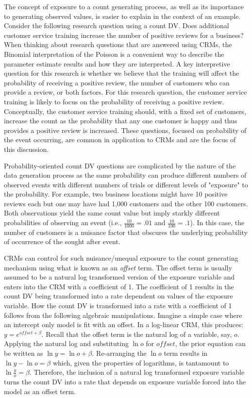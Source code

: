 \documentclass[ShortAfour,times,sageapa]{sagej}
\begin{document}
	The concept of exposure to a count generating process, as well as its importance to generating observed values, is easier to explain in the context of an example.
	Consider the following research question using a count DV.
	Does additional customer service training increase the number of positive reviews for a business?
	When thinking about research questions that are answered using CRMs, the Binomial interpretation of the Poisson is a convenient way to describe the parameter estimate results and how they are interpreted.
	A key interpretive question for this research is whether we believe that the training will affect the probability of receiving a positive review, the number of customers who can provide a review, or both factors.
	For this research question, the customer service training is likely to focus on the probability of receiving a positive review.
	Conceptually, the customer service training should, with a fixed set of customers, increase the count as the probability that any one customer is happy and thus provides a positive review is increased.
	These questions, focused on probability of the event occurring, are common in application to CRMs and are the focus of this discussion.
	
	Probability-oriented count DV questions are complicated by the nature of the data generation process as the same probability can produce different numbers of observed events with different numbers of trials or different levels of "exposure" to the probability.
	For example, two business locations might have 10 positive reviews each but one may have had 1,000 customers and the other 100 customers.
	Both observations yield the same count value but imply starkly different probabilities of observing an event (i.e., $\frac{10}{1000} = .01$ and $\frac{10}{100} = .1$).
	In this case, the number of customers is a nuisance factor that obscures the underlying probability of occurrence of the sought after event.
	
	CRMs can control for such nuisance/unequal exposure to the count generating mechanism using what is known as an \emph{offset} term.  
	The offset term is usually assumed to be a natural log transformed version of the exposure variable and enters into the CRM with a coefficient of 1.
	The coefficient of 1 results in the count DV being transformed into a rate dependent on values of the exposure variable.
	How the count DV is transformed into a rate with a coefficient of 1 follows from the following algebraic manipulations.
	Imagine a simple case where an intercept only model is fit with an offset.
	In a log-linear CRM, this produces: $y = e^{offset + \beta}$.
	Recall that the offset term is the natural log of a variable, say, $o$.  
	Applying the natural log and substituting $\ln o$ for $offset$, the prior equation can be written as $\ln y = \ln o + \beta$.
	Re-arranging the $\ln o$ term results in $\ln y - \ln o = \beta$ which, given the properties of logarithms, is tantamount to $\ln \frac{y}{o} = \beta$.
	Therefore, the inclusion of a natural log transformed exposure variable turns the count DV into a rate that depends on exposure variable forced into the model as an offset term.
	
\end{document}
